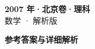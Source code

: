 \documentclass[zihao=-4, a4paper]{ctexart}
\begin{document}
\begin{center}
  {\Large\bfseries 2007 年·北京卷·理科}\\[4pt]
  {\large 数学 · 解析版}
\end{center}
\medskip
{}

\clearpage
{}
\begin{center}{\Large\bfseries 参考答案与详细解析}\end{center}
\medskip

\end{document}
